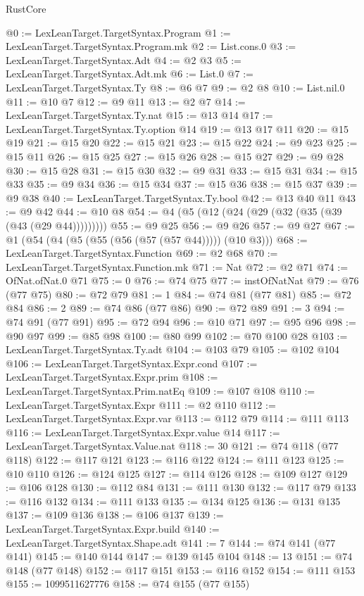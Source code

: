 \begin{lexlean}{RustCore}
\begin{coremodule}
@0 := LexLeanTarget.TargetSyntax.Program
@1 := LexLeanTarget.TargetSyntax.Program.mk
@2 := List.cons.{0}
@3 := LexLeanTarget.TargetSyntax.Adt
@4 := @2 @3
@5 := LexLeanTarget.TargetSyntax.Adt.mk
@6 := List.{0}
@7 := LexLeanTarget.TargetSyntax.Ty
@8 := @6 @7
@9 := @2 @8
@10 := List.nil.{0}
@11 := @10 @7
@12 := @9 @11
@13 := @2 @7
@14 := LexLeanTarget.TargetSyntax.Ty.nat
@15 := @13 @14
@17 := LexLeanTarget.TargetSyntax.Ty.option @14
@19 := @13 @17 @11
@20 := @15 @19
@21 := @15 @20
@22 := @15 @21
@23 := @15 @22
@24 := @9 @23
@25 := @15 @11
@26 := @15 @25
@27 := @15 @26
@28 := @15 @27
@29 := @9 @28
@30 := @15 @28
@31 := @15 @30
@32 := @9 @31
@33 := @15 @31
@34 := @15 @33
@35 := @9 @34
@36 := @15 @34
@37 := @15 @36
@38 := @15 @37
@39 := @9 @38
@40 := LexLeanTarget.TargetSyntax.Ty.bool
@42 := @13 @40 @11
@43 := @9 @42
@44 := @10 @8
@54 := @4 (@5 (@12 (@24 (@29 (@32 (@35 (@39 (@43 (@29 @44)))))))))
@55 := @9 @25
@56 := @9 @26
@57 := @9 @27
@67 := @1 (@54 (@4 (@5 (@55 (@56 (@57 (@57 @44))))) (@10 @3)))
@68 := LexLeanTarget.TargetSyntax.Function
@69 := @2 @68
@70 := LexLeanTarget.TargetSyntax.Function.mk
@71 := Nat
@72 := @2 @71
@74 := OfNat.ofNat.{0} @71
@75 := 0
@76 := @74 @75
@77 := instOfNatNat
@79 := @76 (@77 @75)
@80 := @72 @79
@81 := 1
@84 := @74 @81 (@77 @81)
@85 := @72 @84
@86 := 2
@89 := @74 @86 (@77 @86)
@90 := @72 @89
@91 := 3
@94 := @74 @91 (@77 @91)
@95 := @72 @94
@96 := @10 @71
@97 := @95 @96
@98 := @90 @97
@99 := @85 @98
@100 := @80 @99
@102 := @70 @100 @28
@103 := LexLeanTarget.TargetSyntax.Ty.adt
@104 := @103 @79
@105 := @102 @104
@106 := LexLeanTarget.TargetSyntax.Expr.cond
@107 := LexLeanTarget.TargetSyntax.Expr.prim
@108 := LexLeanTarget.TargetSyntax.Prim.natEq
@109 := @107 @108
@110 := LexLeanTarget.TargetSyntax.Expr
@111 := @2 @110
@112 := LexLeanTarget.TargetSyntax.Expr.var
@113 := @112 @79
@114 := @111 @113
@116 := LexLeanTarget.TargetSyntax.Expr.value @14
@117 := LexLeanTarget.TargetSyntax.Value.nat
@118 := 30
@121 := @74 @118 (@77 @118)
@122 := @117 @121
@123 := @116 @122
@124 := @111 @123
@125 := @10 @110
@126 := @124 @125
@127 := @114 @126
@128 := @109 @127
@129 := @106 @128
@130 := @112 @84
@131 := @111 @130
@132 := @117 @79
@133 := @116 @132
@134 := @111 @133
@135 := @134 @125
@136 := @131 @135
@137 := @109 @136
@138 := @106 @137
@139 := LexLeanTarget.TargetSyntax.Expr.build
@140 := LexLeanTarget.TargetSyntax.Shape.adt
@141 := 7
@144 := @74 @141 (@77 @141)
@145 := @140 @144
@147 := @139 @145 @104
@148 := 13
@151 := @74 @148 (@77 @148)
@152 := @117 @151
@153 := @116 @152
@154 := @111 @153
@155 := 1099511627776
@158 := @74 @155 (@77 @155)

\end{coremodule}
\end{lexlean}
